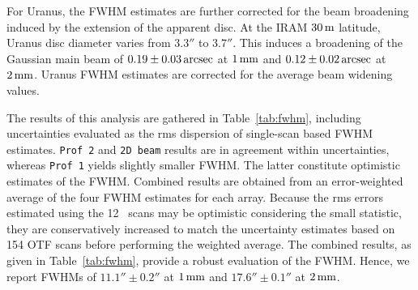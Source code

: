 For Uranus, the
FWHM estimates are further corrected for the beam broadening induced
by the extension of the apparent disc. At the IRAM $30\,\rm{m}$
latitude, Uranus disc diameter varies from $3.3''$ to $3.7''$. This
induces a broadening of the Gaussian main beam of
$0.19 \pm 0.03\,\rm{arcsec}$ at $1\, \rm{mm}$ and $0.12 \pm 0.02\,\rm{arcsec}$
at $2\, \rm{mm}$. Uranus FWHM estimates are corrected for the average beam
widening values.

The results of this analysis are
gathered in Table~\ref{tab:fwhm}, including uncertainties evaluated as
the rms dispersion of single-scan based FWHM estimates.
{\tt Prof 2} and {\tt 2D beam} results are in agreement within
uncertainties, whereas {\tt Prof 1} yields slightly smaller FWHM.
The latter constitute optimistic estimates of the FWHM.
Combined results are obtained from an error-weighted
average of the four FWHM estimates for each array.
Because the rms errors estimated using the 12 \bm\ scans may be
optimistic considering the small statistic, they are conservatively
increased to match the uncertainty estimates based on 154 OTF scans before
performing the weighted average.  
The combined results, as given in
Table~\ref{tab:fwhm}, provide a robust evaluation of the
FWHM. Hence, we report FWHMs of $11.1'' \pm 0.2''$ at
$1\, \rm{mm}$ and $17.6''\pm 0.1''$ at $2\, \rm{mm}$.  

